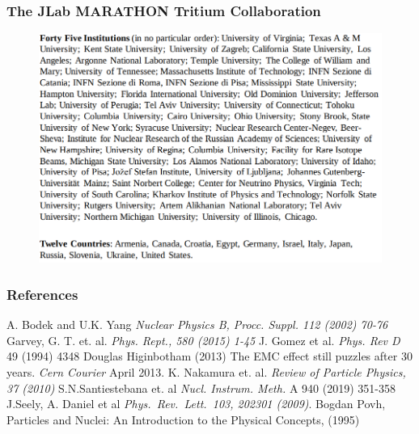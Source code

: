 \documentclass[12pt]{beamer}
\begin{document}
\begin{frame}
\frametitle{The JLab MARATHON Tritium Collaboration}
\vspace{-15pt}

\begin{figure}
\includegraphics[width =11.5cm]{../images/callabos_un.png}
\end{figure}

\end{frame}


\begin{frame}[allowframebreaks]
\vspace*{-3pt}
\frametitle{References}
\footnotesize{
	\begin{thebibliography}{9} %
		\vspace*{-20pt}
		 A. Bodek and U.K. Yang
		\newblock \emph{Nuclear Physics B, Procc. Suppl. 112 (2002) 70-76 }			
\vspace*{-8pt}
		 Garvey, G. T. et. al.
		\newblock \emph{Phys. Rept., 580 (2015) 1-45 }	
\vspace*{-8pt}		
		 J. Gomez et al.   
		\newblock \emph{Phys. Rev D}  49 (1994) 4348 
\vspace*{-8pt}
		 Douglas Higinbotham (2013) 
		\newblock The EMC effect still puzzles after 30 years. \emph{Cern Courier} April 2013.
\vspace*{-8pt}		
		 K. Nakamura et. al.
		\newblock \emph{Review of Particle Physics, 37 (2010) }	
\vspace*{-8pt}		
		 S.N.Santiestebana et. al 
		\newblock 	\emph{Nucl. Instrum. Meth.} A 940 (2019) 351-358
\vspace*{-8pt}				
		 J.Seely, A. Daniel et al  
		\newblock \emph{Phys.\ Rev.\ Lett.\   103, 202301 (2009)}.
\vspace*{-8pt}				
		 Bogdan Povh,
		\newblock Particles and Nuclei: An Introduction to the Physical Concepts, (1995)
	
		
	\end{thebibliography}
}
\end{frame}
\end{document}
